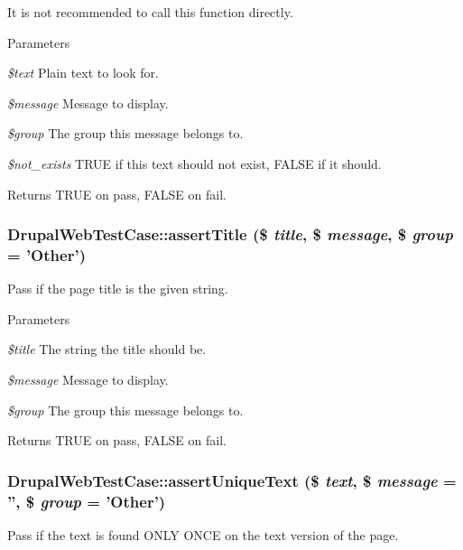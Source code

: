 It is not recommended to call this function directly.


\begin{DoxyParams}{Parameters}
\item[{\em \$text}]Plain text to look for. \item[{\em \$message}]Message to display. \item[{\em \$group}]The group this message belongs to. \item[{\em \$not\_\-exists}]TRUE if this text should not exist, FALSE if it should. \end{DoxyParams}
\begin{DoxyReturn}{Returns}
TRUE on pass, FALSE on fail. 
\end{DoxyReturn}
\hypertarget{class_drupal_web_test_case_ae51a8bfe2db3ab2e5a7373738f843624}{
\subsubsection[{assertTitle}]{\setlength{\rightskip}{0pt plus 5cm}DrupalWebTestCase::assertTitle (\$ {\em title}, \/  \$ {\em message}, \/  \$ {\em group} = {\ttfamily 'Other'})}}
\label{class_drupal_web_test_case_ae51a8bfe2db3ab2e5a7373738f843624}
Pass if the page title is the given string.


\begin{DoxyParams}{Parameters}
\item[{\em \$title}]The string the title should be. \item[{\em \$message}]Message to display. \item[{\em \$group}]The group this message belongs to. \end{DoxyParams}
\begin{DoxyReturn}{Returns}
TRUE on pass, FALSE on fail. 
\end{DoxyReturn}
\hypertarget{class_drupal_web_test_case_aa8d65b2749e7d0430b07bd77f7f4877b}{
\subsubsection[{assertUniqueText}]{\setlength{\rightskip}{0pt plus 5cm}DrupalWebTestCase::assertUniqueText (\$ {\em text}, \/  \$ {\em message} = {\ttfamily ''}, \/  \$ {\em group} = {\ttfamily 'Other'})}}
\label{class_drupal_web_test_case_aa8d65b2749e7d0430b07bd77f7f4877b}
Pass if the text is found ONLY ONCE on the text version of the page.

